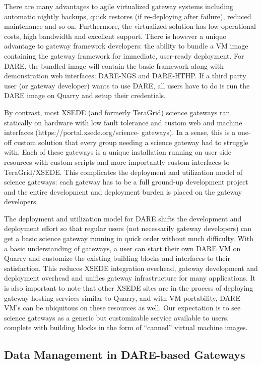 \documentclass[]{svjour3}
\begin{document}
There are many advantages to agile virtualized gateway systems
including automatic nightly backups, quick restores (if re-deploying
after failure), reduced maintenance and so on. Furthermore, the
virtualized solution has low operational costs, high bandwidth and
excellent support. There is however a unique advantage to gateway
framework developers: the ability to bundle a VM image containing the
gateway framework for immediate, user-ready deployment.  For DARE, the
bundled image will contain the basic framework along with
demonstration web interfaces: DARE-NGS and DARE-HTHP. If a third party
user (or gateway developer) wants to use DARE, all users have to do is
run the DARE image on Quarry and setup their credentials.

By contrast, most XSEDE (and formerly TeraGrid) science gateways ran
statically on hardware with low fault tolerance and custom web and
machine interfaces (https://portal.xsede.org/science- gateways). In a
sense, this is a one-off custom solution that every group needing a
science gateway had to struggle with. Each of these gateways is a
unique installation running on user side resources with custom scripts
and more importantly custom interfaces to TeraGrid/XSEDE.  This
complicates the deployment and utilization model of science gateways:
each gateway has to be a full ground-up development project and the
entire development and deployment burden is placed on the gateway
developers.

The deployment and utilization model for DARE shifts the development
and deployment effort so that regular users (not necessarily gateway
developers) can get a basic science gateway running in quick order
without much difficulty.  With a basic understanding of gateways, a
user can start their own DARE VM on Quarry and customize the existing
building blocks and interfaces to their satisfaction. This reduces
XSEDE integration overhead, gateway development and deployment
overhead and unifies gateway infrastructure for many applications. It
is also important to note that other XSEDE sites are in the process of
deploying gateway hosting services similar to Quarry, and with VM
portability, DARE VM's can be ubiquitous on these resources as
well. Our expectation is to see science gateways as a generic but
customizable service available to users, complete with building blocks
in the form of ``canned'' virtual machine images.


\subsection{Data Management in DARE-based Gateways}
\end{document}
